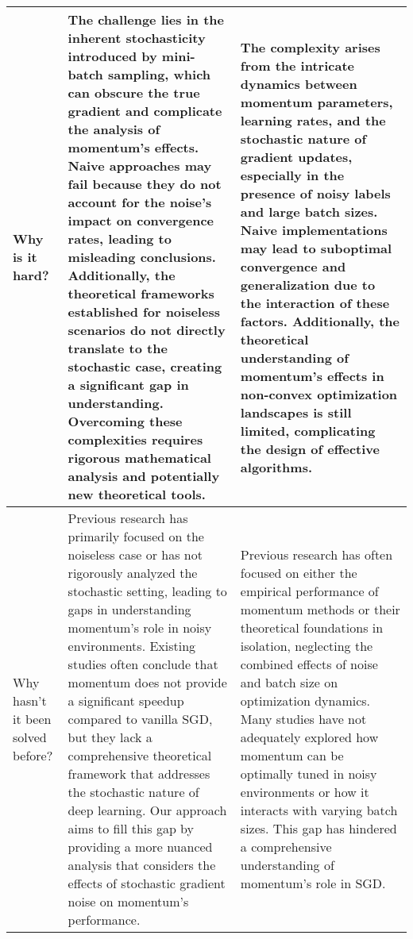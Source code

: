 \begin{table*}[htbp]
\begin{tabular}{p{3cm}p{6cm}p{6cm}}
Why is it hard? & 
The challenge lies in the inherent stochasticity introduced by mini-batch sampling, which can obscure the true gradient and complicate the analysis of momentum's effects. Naive approaches may fail because they do not account for the noise's impact on convergence rates, leading to misleading conclusions. Additionally, the theoretical frameworks established for noiseless scenarios do not directly translate to the stochastic case, creating a significant gap in understanding. Overcoming these complexities requires rigorous mathematical analysis and potentially new theoretical tools. &
The complexity arises from the intricate dynamics between momentum parameters, learning rates, and the stochastic nature of gradient updates, especially in the presence of noisy labels and large batch sizes. Naive implementations may lead to suboptimal convergence and generalization due to the interaction of these factors. Additionally, the theoretical understanding of momentum's effects in non-convex optimization landscapes is still limited, complicating the design of effective algorithms.
\\ \midrule

Why hasn't it been solved before? & 
Previous research has primarily focused on the noiseless case or has not rigorously analyzed the stochastic setting, leading to gaps in understanding momentum's role in noisy environments. Existing studies often conclude that momentum does not provide a significant speedup compared to vanilla SGD, but they lack a comprehensive theoretical framework that addresses the stochastic nature of deep learning. Our approach aims to fill this gap by providing a more nuanced analysis that considers the effects of stochastic gradient noise on momentum's performance. &
Previous research has often focused on either the empirical performance of momentum methods or their theoretical foundations in isolation, neglecting the combined effects of noise and batch size on optimization dynamics. Many studies have not adequately explored how momentum can be optimally tuned in noisy environments or how it interacts with varying batch sizes. This gap has hindered a comprehensive understanding of momentum's role in SGD.
\\ \midrule


\end{tabular}
\end{table*}

